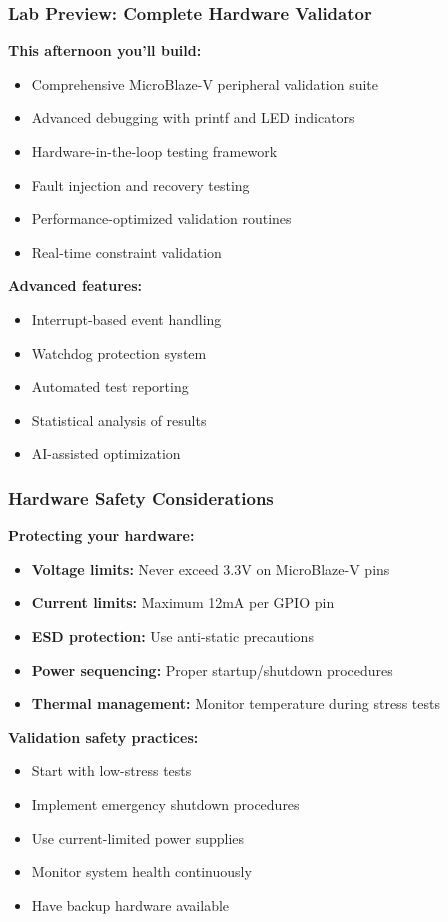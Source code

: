 \documentclass{beamer}
\begin{document}
\begin{frame}
\frametitle{Lab Preview: Complete Hardware Validator}
\textbf{This afternoon you'll build:}
\begin{itemize}
    \item Comprehensive MicroBlaze-V peripheral validation suite
    \item Advanced debugging with printf and LED indicators
    \item Hardware-in-the-loop testing framework
    \item Fault injection and recovery testing
    \item Performance-optimized validation routines
    \item Real-time constraint validation
\end{itemize}

\vspace{0.5cm}
\textbf{Advanced features:}
\begin{itemize}
    \item Interrupt-based event handling
    \item Watchdog protection system
    \item Automated test reporting
    \item Statistical analysis of results
    \item AI-assisted optimization
\end{itemize}
\end{frame}

\begin{frame}
\frametitle{Hardware Safety Considerations}
\textbf{Protecting your hardware:}
\begin{itemize}
    \item \textbf{Voltage limits:} Never exceed 3.3V on MicroBlaze-V pins
    \item \textbf{Current limits:} Maximum 12mA per GPIO pin
    \item \textbf{ESD protection:} Use anti-static precautions
    \item \textbf{Power sequencing:} Proper startup/shutdown procedures
    \item \textbf{Thermal management:} Monitor temperature during stress tests
\end{itemize}

\vspace{0.5cm}
\textbf{Validation safety practices:}
\begin{itemize}
    \item Start with low-stress tests
    \item Implement emergency shutdown procedures
    \item Use current-limited power supplies
    \item Monitor system health continuously
    \item Have backup hardware available
\end{itemize}
\end{frame}
\end{document}
